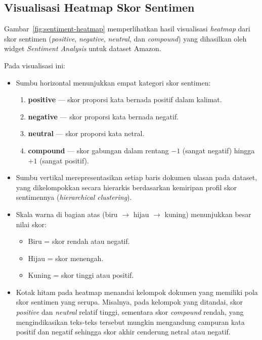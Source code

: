 \subsection*{Visualisasi Heatmap Skor Sentimen}

Gambar~\ref{fig:sentiment-heatmap} memperlihatkan hasil visualisasi \textit{heatmap} dari skor sentimen (\textit{positive}, \textit{negative}, \textit{neutral}, dan \textit{compound}) yang dihasilkan oleh widget \textit{Sentiment Analysis} untuk dataset Amazon.

Pada visualisasi ini:
\begin{itemize}
	\item Sumbu horizontal menunjukkan empat kategori skor sentimen:
	\begin{enumerate}
		\item \textbf{positive} — skor proporsi kata bernada positif dalam kalimat.
		\item \textbf{negative} — skor proporsi kata bernada negatif.
		\item \textbf{neutral} — skor proporsi kata netral.
		\item \textbf{compound} — skor gabungan dalam rentang $-1$ (sangat negatif) hingga $+1$ (sangat positif).
	\end{enumerate}
	
	\item Sumbu vertikal merepresentasikan setiap baris dokumen ulasan pada dataset, yang dikelompokkan secara hierarkis berdasarkan kemiripan profil skor sentimennya (\textit{hierarchical clustering}).
	
	\item Skala warna di bagian atas (biru $\rightarrow$ hijau $\rightarrow$ kuning) menunjukkan besar nilai skor:
	\begin{itemize}
		\item Biru = skor rendah atau negatif.
		\item Hijau = skor menengah.
		\item Kuning = skor tinggi atau positif.
	\end{itemize}
	
	\item Kotak hitam pada heatmap menandai kelompok dokumen yang memiliki pola skor sentimen yang serupa. Misalnya, pada kelompok yang ditandai, skor \textit{positive} dan \textit{neutral} relatif tinggi, sementara skor \textit{compound} rendah, yang mengindikasikan teks-teks tersebut mungkin mengandung campuran kata positif dan negatif sehingga skor akhir cenderung netral atau negatif.
\end{itemize}

